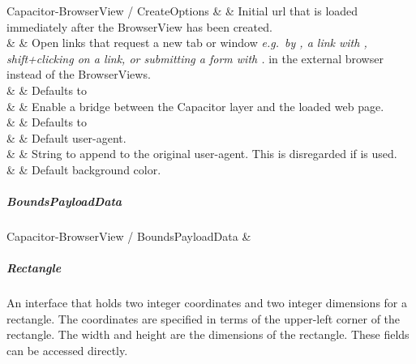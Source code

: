 \begin{interfacedesc}{Capacitor-BrowserView / CreateOptions}
                    &    & Initial \ac{url} that is loaded immediately after the BrowserView has been created. \\ \hline
   &   & Open links that request a new tab or window \textit{e.g.\ by , a link with , shift+clicking on a link, or submitting a form with .} in the external browser instead of the BrowserViews. \\
                              &                             & Defaults to  \\ \hline
           &   & Enable a bridge between the Capacitor layer and the loaded web page. \\
                              &                             & Defaults to  \\ \hline
      &    & Default user-agent. \\ \hline
        &    & String to append to the original user-agent. This is disregarded if  is used. \\ \hline
        &     & Default background color. \\ \hline
\end{interfacedesc}


\subparagraph{BoundsPayloadData}

\begin{interface}{Capacitor-BrowserView / BoundsPayloadData}
   &  \\ \hline
\end{interface}


\newpage

\subparagraph{Rectangle}

An interface that holds two integer coordinates and two integer dimensions for a rectangle.
The coordinates are specified in terms of the upper-left corner of the rectangle.
The width and height are the dimensions of the rectangle.
These fields can be accessed directly.

